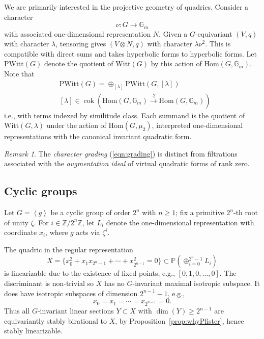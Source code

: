 \documentclass[12pt]{amsart}
\numberwithin{equation}{section}
\newcommand{\lra}{\longrightarrow}
\newcommand{\ra}{\rightarrow}
\newcommand{\bG}{\mathbb{G}}
\newcommand{\bP}{\mathbb{P}}
\newcommand{\bZ}{\mathbb{Z}}
\newcommand{\cok}{\operatorname{cok}}
\newcommand{\Hom}{\mathrm{Hom}}
\newcommand{\PWitt}{\mathrm{PWitt}}
\newcommand{\Witt}{\mathrm{Witt}}
\theoremstyle{plain}
\theoremstyle{definition}
\theoremstyle{remark}
\newtheorem{rema}[prop]{Remark}
\begin{document}
We are primarily interested in the projective
geometry of quadrics. Consider a character
$$\nu:G \ra \bG_m$$
with associated one-dimensional representation $N$.
Given a $G$-equivariant $(V,q)$ with character 
$\lambda$, tensoring gives $(V\otimes N,q)$
with character $\lambda \nu^2$.
This is compatible with direct sums and takes
hyperbolic forms to hyperbolic forms. 
Let $\PWitt(G)$ denote the quotient of 
$\Witt(G)$ by this action of $\Hom(G,\bG_m)$. 
Note that 
\begin{align*}
& \PWitt(G) = \oplus_{[\lambda]}
\PWitt(G,[\lambda]) \\
&[\lambda] \in \cok\left(\Hom(G,\bG_m) \stackrel{\cdot 2}{\lra} \Hom(G,\bG_m)\right) 
\end{align*}
i.e., with terms indexed by similitude class.
Each summand is the quotient of $\Witt(G,\lambda)$
under the action of $\Hom(G,\mu_2)$, interpreted
one-dimensional representations with the canonical
invariant quadratic form.





\begin{rema}
The {\em character grading} (\ref{eqn:grading}) is
distinct from filtrations associated with the {\em augmentation ideal} of virtual quadratic forms of rank zero.
\end{rema}

\subsection*{Cyclic groups}
Let $G=\left<g\right>$ be a cyclic group of order $2^n$ with $n\ge 1$; 
fix a primitive
$2^n$-th root of unity $\zeta$.
For $i \in \bZ/2^n\bZ$, let $L_i$ denote the one-dimensional
representation with coordinate $x_i$, where $g$ acts via $\zeta^i$. 



The quadric in the regular representation
$$X=\{x_0^2+x_1x_{2^n-1}+\cdots + x_{2^{n-1}}^2=0\} \subset \bP(\oplus_{i=0}^{2^n-1}L_i)$$ is 
linearizable due to the existence of fixed points, e.g.,
$[0,1,0,\ldots,0]$. The discriminant is non-trivial
so $X$ has no $G$-invariant maximal isotropic subspace.
It does have isotropic subspaces of dimension 
$2^{n-1}-1$, e.g.,
$$x_0=x_1=\cdots =x_{2^{n-1}}=0.$$
Thus all $G$-invariant linear sections $Y\subset X$
with $\dim(Y)\ge 2^{n-1}$ are equivariantly
stably birational to $X$, by Proposition~\ref{prop:whyPfister}, hence stably linearizable.
\end{document}
